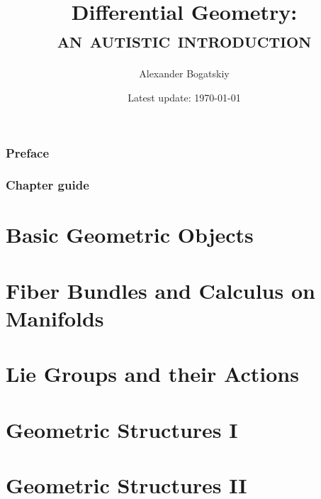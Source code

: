 \documentclass[english,a5paper]{book}%
\begin{document}
\title{
    {\Large{}Differential Geometry:}\\
    \textsc{an autistic introduction}
    }
\author{Alexander Bogatskiy}
\date{Latest update: \today}

\maketitle

\tableofcontents{}

\clearpage
\printglossary[type=\acronymtype,title=Abbreviations,style=long,nonumberlist] %

\clearpage
\section*{Preface}


\clearpage
\section*{Chapter guide}



\part{Basic Geometric Objects}



\clearpage
\part{Fiber Bundles and Calculus on Manifolds}



\clearpage
\part{Lie Groups and their Actions}\label{part Lie group actions}



\clearpage
\part{Geometric Structures I}\label{Part Structured Geom I}



\clearpage
\part{Geometric Structures II}\label{Part Structured Geom II}

\end{document}
